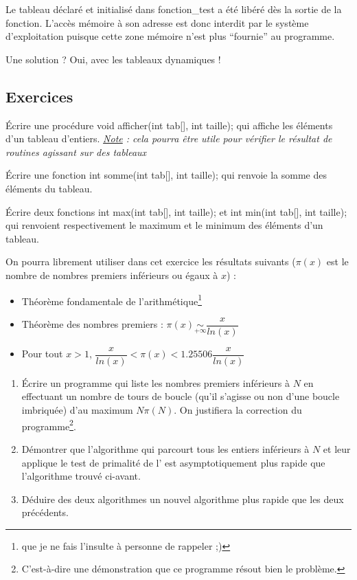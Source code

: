 \documentclass[../../../main.tex]{subfiles}
\begin{document}
Le tableau déclaré et initialisé dans \textsf{fonction\_test} a été libéré dès la sortie de la fonction. L'accès mémoire à son adresse est donc interdit par le système d'exploitation puisque cette zone mémoire n'est plus ``fournie'' au programme.
 
Une solution ? Oui, avec les tableaux dynamiques !
\subsection{Exercices}
Écrire une procédure \textsf{void afficher(int tab[], int taille);} qui affiche les éléments d'un tableau d'entiers.\newline
\textit{\underline{Note} : cela pourra être utile pour vérifier le résultat de routines agissant sur des tableaux}
 
Écrire une fonction \textsf{int somme(int tab[], int taille);} qui renvoie la somme des éléments du tableau.
 
Écrire deux fonctions \textsf{int max(int tab[], int taille);} et \textsf{int min(int tab[], int taille);} qui renvoient respectivement le maximum et le minimum des éléments d'un tableau.

On pourra librement utiliser dans cet exercice les résultats suivants ($\pi(x)$ est le nombre de nombres premiers inférieurs ou égaux à $x$) :
\begin{itemize}
	\item Théorème fondamentale de l'arithmétique\footnote{que je ne fais l'insulte à personne de rappeler ;)}
	\item Théorème des nombres premiers : $\pi(x)\underset{+\infty}{\sim} \dfrac{x}{ln(x)}$
	\item Pour tout $x > 1$, $\dfrac{x}{ln(x)} < \pi(x) < 1.25506\dfrac{x}{ln(x)}$ \cite{PrimeFunctions}
\end{itemize}
\begin{enumerate}
	\item Écrire un programme qui liste les nombres premiers inférieurs à $N$ en effectuant un nombre de tours de boucle (qu'il s'agisse ou non d'une boucle imbriquée) d'au maximum $N\pi(N)$. On justifiera la correction du programme\footnote{C'est-à-dire une démonstration que ce programme résout bien le problème.}.
	\item Démontrer que l'algorithme qui parcourt tous les entiers inférieurs à $N$ et leur applique le test de primalité de l' est asymptotiquement plus rapide que l'algorithme trouvé ci-avant.
	\item Déduire des deux algorithmes un nouvel algorithme plus rapide que les deux précédents.
\end{enumerate}
\end{document}
